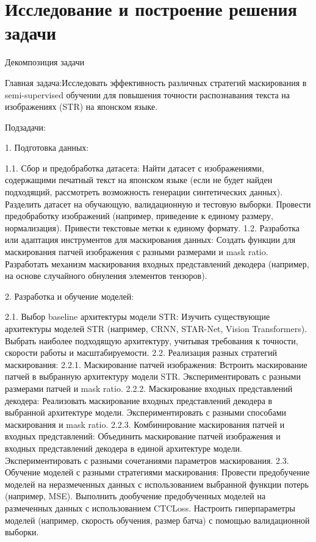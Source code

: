 \section{Исследование и построение решения задачи}
\label{sec:Chapter3} 

Декомпозиция задачи

Главная задача:Исследовать эффективность различных стратегий маскирования в semi-supervised обучении для повышения точности распознавания текста на изображениях (STR) на японском языке.

Подзадачи:

1. Подготовка данных:

1.1. Сбор и предобработка датасета:
    Найти  датасет  с  изображениями,  содержащими  печатный  текст  на  японском  языке  (если  не  будет  найден  подходящий,  рассмотреть  возможность  генерации  синтетических  данных). 
    Разделить  датасет  на  обучающую,  валидационную  и  тестовую  выборки.
    Провести  предобработку  изображений  (например,  приведение  к  единому  размеру,  нормализация). 
    Привести  текстовые  метки  к  единому  формату. 
1.2. Разработка  или  адаптация  инструментов  для  маскирования  данных:
     Создать  функции  для  маскирования  патчей  изображения  с  разными  размерами  и  mask ratio.
     Разработать  механизм  маскирования  входных  представлений  декодера  (например,  на  основе  случайного  обнуления  элементов  тензоров). 

2. Разработка и обучение моделей:

2.1.  Выбор  baseline  архитектуры  модели  STR:
    Изучить  существующие  архитектуры  моделей  STR  (например,  CRNN,  STAR-Net,  Vision Transformers).
    Выбрать  наиболее  подходящую  архитектуру,  учитывая  требования  к  точности,  скорости  работы  и  масштабируемости.
2.2. Реализация  разных  стратегий  маскирования:
    2.2.1. Маскирование  патчей  изображения:
         Встроить  маскирование  патчей  в  выбранную  архитектуру  модели  STR. 
         Экспериментировать  с  разными  размерами  патчей  и  mask ratio.
    2.2.2. Маскирование  входных  представлений  декодера:
         Реализовать  маскирование  входных  представлений  декодера  в  выбранной  архитектуре  модели.
          Экспериментировать  с  разными  способами  маскирования  и  mask ratio.
    2.2.3. Комбинирование  маскирования  патчей  и  входных  представлений:
         Объединить  маскирование  патчей  изображения  и  входных  представлений  декодера  в  единой  архитектуре  модели.
          Экспериментировать  с  разными  сочетаниями  параметров  маскирования.
2.3.  Обучение  моделей  с  разными  стратегиями  маскирования:
     Провести  предобучение  моделей  на  неразмеченных  данных  с  использованием  выбранной  функции  потерь (например,  MSE).
     Выполнить  дообучение  предобученных  моделей  на  размеченных  данных  с  использованием  CTCLoss.
     Настроить  гиперпараметры  моделей  (например,  скорость  обучения,  размер  батча)  с  помощью  валидационной  выборки.

